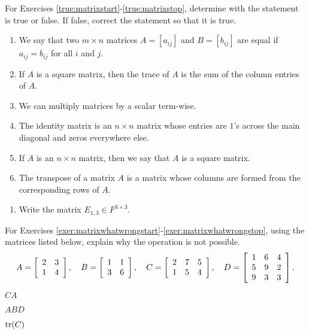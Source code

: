\noindent For Exercises \ref{true:matrixstart}-\ref{true:matrixstop}, determine with the statement is true or false. If false, correct the statement so that it is true.
\begin{enumerate}[!HW!, start=1]
\item\label{true:matrixstart} We say that two $m\times n$ matrices $A=[a_{ij}]$ and $B=[b_{ij}]$ are equal if $a_{ij}=b_{ij}$ for all $i$ and $j$. %
\item If $A$ is a square matrix, then the trace of $A$ is the sum of the column entries of $A$. %
\item We can multiply matrices by a scalar term-wise. %
\item The identity matrix is an $n\times n$ matrix whose entries are $1$'s across the main diagonal and zeros everywhere else. %
\item If $A$ is an $n\times n$ matrix, then we say that $A$ is a square matrix. %
\item\label{true:matrixstop} The transpose of a matrix $A$ is a matrix whose columns are formed from the corresponding rows of $A$.\\ %
\end{enumerate}

\begin{enumerate}[!HW!]
\item Write the matrix $E_{1,3}\in F^{3\times 3}$.
\end{enumerate}

\noindent For Exercises \ref{exer:matrixwhatwrongstart}-\ref{exer:matrixwhatwrongstop}, using the matrices listed below, explain why the operation is not possible.
\[A = \mtx{rr}{2&3\\1&4},\quad B = \mtx{rr}{1&1\\3&6}, \quad C = \mtx{rrr}{2&7&5\\1&5&4},\quad D=\mtx{rrr}{1&6&4\\5&9&2\\9&3&3}.\]
\begin{enumerate}[!HW!]
\begin{multicols}{3}
\item\label{exer:matrixwhatwrongstart} $CA$ %
\item $ABD$%
\item\label{exer:matrixwhatwrongstop} $\tr(C)$ %
\end{multicols}
\end{enumerate}

